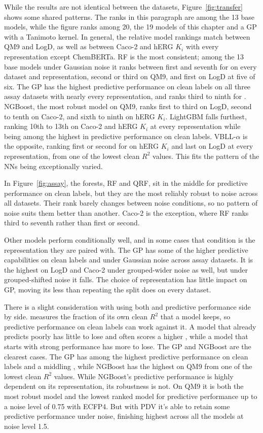 While the results are not identical between the datasets, Figure~\ref{fig:transfer} shows some shared patterns. The ranks in this paragraph are among the 13 base models, while the figure ranks among 20, the 19 models of this chapter and a GP with a Tanimoto kernel. In general, the relative \aucnorm{} model rankings match between QM9 and LogD, as well as between Caco-2 and hERG $K_i$ with every representation except ChemBERTa. RF is the most consistent; among the 13 base models under Gaussian noise it ranks between first and seventh for \aucnorm{} on every dataset and representation, second or third on QM9, and first on LogD at five of six. The GP has the highest predictive performance on clean labels on all three assay datasets with nearly every representation, and ranks third to ninth for \aucnorm. NGBoost, the most robust model on QM9, ranks first to third on LogD, second to tenth on Caco-2, and sixth to ninth on hERG $K_i$. LightGBM falls furthest, ranking 10th to 13th on Caco-2 and hERG $K_i$ at every representation while being among the highest in predictive performance on clean labels. VBLL-$\alpha$ is the opposite, ranking first or second for \aucnorm{} on hERG
$K_i$ and last on LogD at every representation, from one of the lowest clean $R^2$ values. This fits the pattern of the NNs being exceptionally varied.

In Figure~\ref{fig:assay}, the forests, RF and QRF, sit in the middle for predictive performance on clean labels, but they are the most reliably robust to noise across all datasets. Their rank barely changes between noise conditions, so no pattern of noise suits them better than another. Caco-2 is the exception, where RF ranks third to seventh rather than first or second.

Other models perform conditionally well, and in some cases that condition is the representation they are paired with. The GP has some of the higher predictive capabilities on clean labels and under Gaussian noise across assay datasets. It is the highest on LogD and Caco-2 under grouped-wider noise as well, but under grouped-shifted noise it falls. The choice of representation has little impact on GP, moving its \aucnorm{} less than repeating the split does on every dataset.

There is a slight consideration with using both \aucnorm{} and predictive performance side by side. \aucnorm{} measures the fraction of its own clean $R^2$ that a model keeps, so predictive performance on clean labels can work against it. A model that already predicts poorly has little to lose and often scores a higher \aucnorm, while a model that starts with strong performance has more to lose. The GP and NGBoost are the clearest cases. The GP has among the highest predictive performance on clean labels and a middling \aucnorm, while NGBoost has the highest \aucnorm{} on QM9 from one of the lowest clean $R^2$ values. While NGBoost's predictive performance is highly dependent on its representation, its robustness is not. On QM9 it is both the most robust model and the lowest ranked model for predictive performance up to a noise level of 0.75 with ECFP4. But with PDV it's able to retain some predictive performance under noise, finishing highest across all the models at noise level 1.5.

